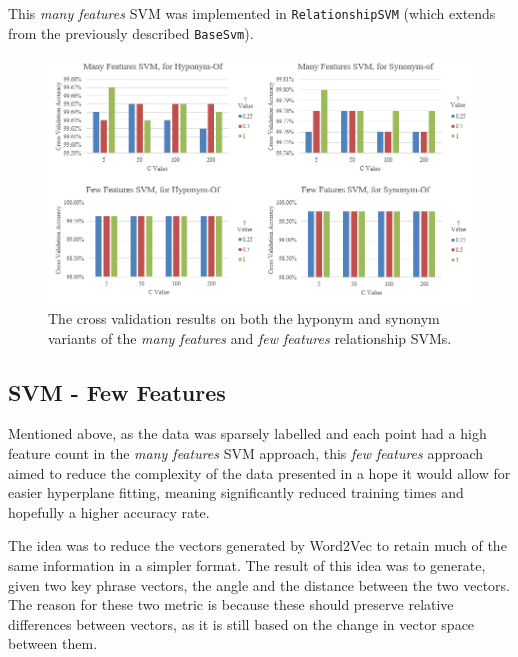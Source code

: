 This \textit{many features} SVM was implemented in \texttt{RelationshipSVM} (which extends from the previously described \texttt{BaseSvm}).

\begin{figure}
	\includegraphics[width=\textwidth]{img/relsvmcrossvalidation.png}
	\caption[Relation SVM Cross Validation]{The cross validation results on both the hyponym and synonym variants of the \textit{many features} and \textit{few features} relationship SVMs.}
	\label{figure:relsvmcv}
\end{figure}

\subsection{SVM - Few Features}
Mentioned above, as the data was sparsely labelled and each point had a high feature count in the \textit{many features} SVM approach, this \textit{few features} approach aimed to reduce the complexity of the data presented in a hope it would allow for easier hyperplane fitting, meaning significantly reduced training times and hopefully a higher accuracy rate.

The idea was to reduce the vectors generated by Word2Vec to retain much of the same information in a simpler format. The result of this idea was to generate, given two key phrase vectors, the angle and the distance between the two vectors. The reason for these two metric is because these should preserve relative differences between vectors, as it is still based on the change in vector space between them.

